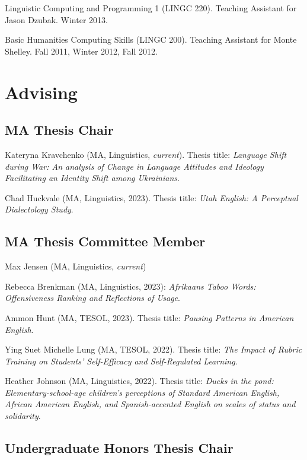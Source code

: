 \documentclass[
]{article}
\begin{document}
Linguistic Computing and Programming 1 (LINGC 220). Teaching Assistant
for Jason Dzubak. Winter 2013.

Basic Humanities Computing Skills (LINGC 200). Teaching Assistant for
Monte Shelley. Fall 2011, Winter 2012, Fall 2012.

\hypertarget{advising}{%
\section{Advising}\label{advising}}

\hypertarget{ma-thesis-chair}{%
\subsection{MA Thesis Chair}\label{ma-thesis-chair}}

Kateryna Kravchenko (MA, Linguistics, \emph{current}). Thesis title:
\emph{Language Shift during War: An analysis of Change in Language
Attitudes and Ideology Facilitating an Identity Shift among Ukrainians}.

Chad Huckvale (MA, Linguistics, 2023). Thesis title: \emph{Utah English:
A Perceptual Dialectology Study}.

\hypertarget{ma-thesis-committee-member}{%
\subsection{MA Thesis Committee
Member}\label{ma-thesis-committee-member}}

Max Jensen (MA, Linguistics, \emph{current})

Rebecca Brenkman (MA, Linguistics, 2023): \emph{Afrikaans Taboo Words:
Offensiveness Ranking and Reflections of Usage}.

Ammon Hunt (MA, TESOL, 2023). Thesis title: \emph{Pausing Patterns in
American English}.

Ying Suet Michelle Lung (MA, TESOL, 2022). Thesis title: \emph{The
Impact of Rubric Training on Students' Self-Efficacy and Self-Regulated
Learning}.

Heather Johnson (MA, Linguistics, 2022). Thesis title: \emph{Ducks in
the pond: Elementary-school-age children's perceptions of Standard
American English, African American English, and Spanish-accented English
on scales of status and solidarity}.

\hypertarget{undergraduate-honors-thesis-chair}{%
\subsection{Undergraduate Honors Thesis
Chair}\label{undergraduate-honors-thesis-chair}}
\end{document}
